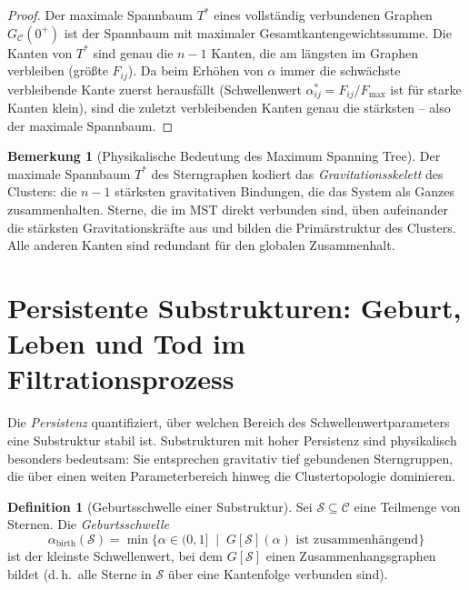 ﻿\documentclass[a4paper,12pt]{report}
\theoremstyle{definition}
\newtheorem{definition}{Definition}
\newtheorem{bemerkung}{Bemerkung}
\begin{document}
\begin{proof}
Der maximale Spannbaum $T^*$ eines vollständig verbundenen Graphen $G_\mathcal{C}(0^+)$ ist der Spannbaum mit maximaler Gesamtkantengewichtssumme. Die Kanten von $T^*$ sind genau die $n-1$ Kanten, die am längsten im Graphen verbleiben (größte $F_{ij}$). Da beim Erhöhen von $\alpha$ immer die schwächste verbleibende Kante zuerst herausfällt (Schwellenwert $\alpha^*_{ij} = F_{ij}/F_\mathrm{max}$ ist für starke Kanten klein), sind die zuletzt verbleibenden Kanten genau die stärksten -- also der maximale Spannbaum.
\end{proof}

\begin{bemerkung}[Physikalische Bedeutung des Maximum Spanning Tree]
Der maximale Spannbaum $T^*$ des Sterngraphen kodiert das \emph{Gravitationsskelett} des Clusters: die $n-1$ stärksten gravitativen Bindungen, die das System als Ganzes zusammenhalten. Sterne, die im MST direkt verbunden sind, üben aufeinander die stärksten Gravitationskräfte aus und bilden die Primärstruktur des Clusters. Alle anderen Kanten sind redundant für den globalen Zusammenhalt.
\end{bemerkung}

\section{Persistente Substrukturen: Geburt, Leben und Tod im Filtrationsprozess}
\label{sec:persistenz}

Die \emph{Persistenz} quantifiziert, über welchen Bereich des Schwellenwertparameters eine Substruktur stabil ist. Substrukturen mit hoher Persistenz sind physikalisch besonders bedeutsam: Sie entsprechen gravitativ tief gebundenen Sterngruppen, die über einen weiten Parameterbereich hinweg die Clustertopologie dominieren.

\begin{definition}[Geburtsschwelle einer Substruktur]
\label{def:geburt}
Sei $\mathcal{S} \subseteq \mathcal{C}$ eine Teilmenge von Sternen. Die \emph{Geburtsschwelle}
\[
\alpha_\mathrm{birth}(\mathcal{S}) = \min\bigl\{\alpha \in (0,1] \;\mid\; G[\mathcal{S}](\alpha) \text{ ist zusammenhängend}\bigr\}
\]
ist der kleinste Schwellenwert, bei dem $G[\mathcal{S}]$ einen Zusammenhangs\-graphen bildet (d.\,h.\ alle Sterne in $\mathcal{S}$ über eine Kantenfolge verbunden sind).
\end{definition}
\end{document}
